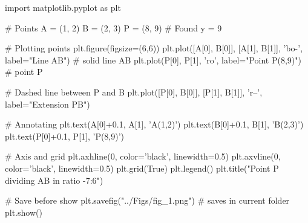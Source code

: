 import matplotlib.pyplot as plt

# Points
A = (1, 2)
B = (2, 3)
P = (8, 9)  # Found y = 9

# Plotting points
plt.figure(figsize=(6,6))
plt.plot([A[0], B[0]], [A[1], B[1]], 'bo-', label="Line AB")   # solid line AB
plt.plot(P[0], P[1], 'ro', label="Point P(8,9)")              # point P

# Dashed line between P and B
plt.plot([P[0], B[0]], [P[1], B[1]], 'r--', label="Extension PB")

# Annotating
plt.text(A[0]+0.1, A[1], 'A(1,2)')
plt.text(B[0]+0.1, B[1], 'B(2,3)')
plt.text(P[0]+0.1, P[1], 'P(8,9)')

# Axis and grid
plt.axhline(0, color='black', linewidth=0.5)
plt.axvline(0, color='black', linewidth=0.5)
plt.grid(True)
plt.legend()
plt.title("Point P dividing AB in ratio -7:6")

# Save before show
plt.savefig("../Figs/fig_1.png")  # saves in current folder
plt.show()
